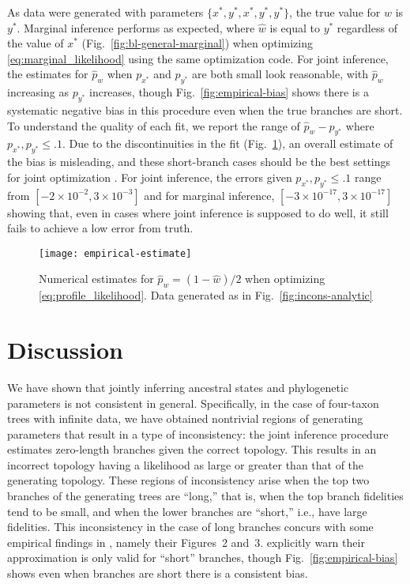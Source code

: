 \documentclass[11pt]{article}
\begin{document}
As data were generated with parameters $\{x^*, y^*, x^*, y^*, y^*\}$, the true value for $w$ is $y^*$.
Marginal inference performs as expected, where $\hat{w}$ is equal to $y^*$ regardless of the value of $x^*$ (Fig.~\ref{fig:bl-general-marginal}) when optimizing \eqref{eq:marginal_likelihood} using the same optimization code.
For joint inference, the estimates for $\hat{p}_w$ when $p_{x^*}$ and $p_{y^*}$ are both small look reasonable, with $\hat{p}_w$ increasing as $p_{y^*}$ increases, though Fig.~\ref{fig:empirical-bias} shows there is a systematic negative bias in this procedure even when the true branches are short.
To understand the quality of each fit, we report the range of $\hat{p}_w-p_{y^*}$ where $p_{x^*}, p_{y^*} \le .1$.
Due to the discontinuities in the fit (Fig.~\ref{fig:bl-general-inconsistency}), an overall estimate of the bias is misleading, and these short-branch cases should be the best settings for joint optimization \citep{Sagulenko2018-xl}.
For joint inference, the errors given $p_{x^*}, p_{y^*} \le .1$ range from $[-2\times 10^{-2}, 3\times 10^{-3}]$ and for marginal inference, $[-3\times 10^{-17}, 3\times 10^{-17}]$ showing that, even in cases where joint inference is supposed to do well, it still fails to achieve a low error from truth.

\begin{figure}
\centering
\texttt{[image: empirical-estimate]}
\caption{
    Numerical estimates for $\hat{p}_w=(1-\hat{w})/2$ when optimizing \eqref{eq:profile_likelihood}.
    Data generated as in Fig.~\ref{fig:incons-analytic}
}
\label{fig:bl-general-inconsistency}
\end{figure}

\section*{Discussion}

We have shown that jointly inferring ancestral states and phylogenetic parameters \citep{Sagulenko2018-xl} is not consistent in general.
Specifically, in the case of four-taxon trees with infinite data, we have obtained nontrivial regions of generating parameters that result in a type of inconsistency: the joint inference procedure estimates zero-length branches given the correct topology.
This results in an incorrect topology having a likelihood as large or greater than that of the generating topology.
These regions of inconsistency arise when the top two branches of the generating trees are ``long,'' that is, when the top branch fidelities tend to be small, and when the lower branches are ``short,'' i.e., have large fidelities.
This inconsistency in the case of long branches concurs with some empirical findings in \citet{Sagulenko2018-xl}, namely their Figures~2 and~3.
\citet{Sagulenko2018-xl} explicitly warn their approximation is only valid for ``short'' branches, though Fig.~\ref{fig:empirical-bias} shows even when branches are short there is a consistent bias.
\end{document}
